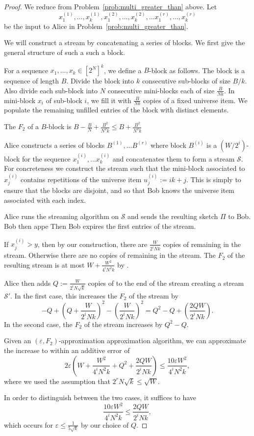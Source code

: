 \documentclass{article}
\newcommand{\eps}{\varepsilon}
\theoremstyle{plain}
\newcommand{\REF}{ {\color{red} \boxed{REF}} }
\newcommand{\FILL}{ {\color{red} \boxed{FILL}} }
\begin{document}
\begin{proof}
We reduce from Problem~\ref{prob:multi_greater_than} above.  Let 
\[
x^{(1)}_1, \ldots, x^{(1)}_k, x^{(2)}_1, \ldots, x^{(2)}_k, \ldots x^{(r)}_1, \ldots, x^{(r)}_k
\]
be the input to Alice in Problem~\ref{prob:multi_greater_than}.


We will construct a stream by concatenating a series of blocks.  We first give the general structure of such a such a block.

For a sequence $x_1, \ldots, x_k \in [2^N]^k$, we define a $B$-block as follows.
The block is a sequence of length $B.$  Divide the block into $k$ consecutive sub-blocks of size $B/k$. Also divide each sub-block into $N$ consecutive mini-blocks each of size $\frac{B}{Nk}.$  In mini-block $x_i$ of sub-block $i$, we fill it with $\frac{B}{Nk}$ copies of a fixed universe item.  We populate the remaining unfilled entries of the block with distinct elements.

The $F_2$ of a $B$-block is $B - \frac{B}{N} + \frac{B^2}{N^2 k} \leq B + \frac{B^2}{N^2 k}$

Alice constructs a series of blocks $B^{(1)}, \ldots B^{(r)}$ where block $B^{(i)}$ is a $(W/2^i)$-block for the sequence $x^{(i)}_1, \ldots x^{(i)}_k$ and concatenates them to form a stream $\mathcal{S}.$  For concreteness we  construct the stream such that the mini-block associated to $x^{(i)}_j$ contains repetitions of the universe item $u^{(i)}_j := ik + j.$ This is simply to ensure that the blocks are disjoint, and so that Bob knows the universe item associated with each index.

Alice runs the streaming algorithm on $\mathcal{S}$ and sends the resulting sketch $\Pi$ to Bob.  Bob then appe  Then Bob expires the first \FILL entries of the stream.

If $x^{(i)}_j > y$, then by our construction, there are $\frac{W}{2^i Nk}$ copies of \FILL remaining in the stream.  Otherwise there are no copies of \FILL remaining in the stream.  The $F_2$ of the resulting stream is at most $W + \frac{W^2}{4^i N^2 k}$ by \REF. 

Alice then adds $Q := \frac{W}{2^i N \sqrt{k}}$ copies of \REF to the end of the stream creating a stream $\mathcal{S}'$.  In the first case, this increases the $F_2$ of the stream by 
\[
-Q + \left(Q + \frac{W}{2^i Nk}\right)^2 - \left(\frac{W}{2^i Nk}\right)^2
= Q^2 - Q + \left(\frac{2QW}{2^i Nk}\right).
\] In the second case, the $F_2$ of the stream increases by $Q^2 - Q.$

Given an $(\eps, F_2)$-approximation approximation algorithm, we can approximate the increase to within an additive error of 
\[
2\eps \left(W + \frac{W^2}{4^i N^2 k} + Q^2 + \frac{2QW}{2^i N k} \right)
\leq \frac{10\eps W^2}{4^i N^2 k},
\]
where we used the assumption that $2^r N \sqrt{k} \leq \sqrt{W}.$

In order to distinguish between the two cases, it suffices to have
\[
\frac{10\eps W^2}{4^i N^2 k} \leq \frac{2QW}{2^i N k},
\]
which occurs for $\eps \leq \frac{1}{5\sqrt{k}}$ by our choice of $Q.$
\end{proof}
\fi
\end{document}
